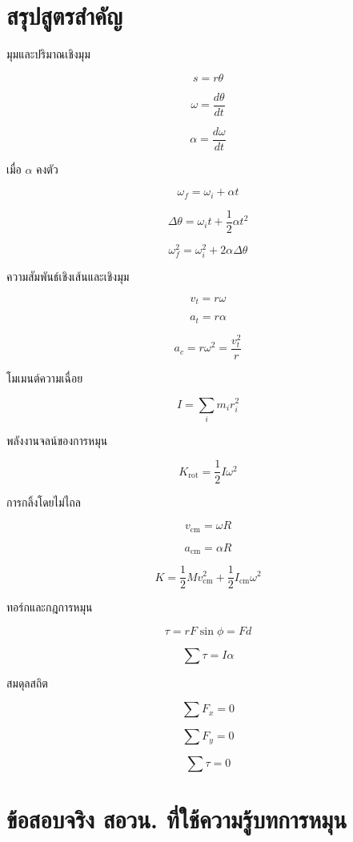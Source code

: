 \section{สรุปสูตรสำคัญ}

\begin{tcolorbox}[title=สรุปบท: การหมุนของวัตถุแข็งเกร็ง]
มุมและปริมาณเชิงมุม

\[
s=r\theta
\]

\[
\omega=\frac{d\theta}{dt}
\]

\[
\alpha=\frac{d\omega}{dt}
\]

เมื่อ $\alpha$ คงตัว

\[
\omega_f=\omega_i+\alpha t
\]

\[
\Delta\theta=\omega_i t+\frac{1}{2}\alpha t^2
\]

\[
\omega_f^2=\omega_i^2+2\alpha\Delta\theta
\]

ความสัมพันธ์เชิงเส้นและเชิงมุม

\[
v_t=r\omega
\]

\[
a_t=r\alpha
\]

\[
a_c=r\omega^2=\frac{v_t^2}{r}
\]
\end{tcolorbox}

\begin{tcolorbox}[title=สรุปบท: การหมุนของวัตถุแข็งเกร็ง ต่อ]
โมเมนต์ความเฉื่อย

\[
I=\sum_i m_i r_i^2
\]

พลังงานจลน์ของการหมุน

\[
K_{\text{rot}}=\frac{1}{2}I\omega^2
\]

การกลิ้งโดยไม่ไถล

\[
v_{\text{cm}}=\omega R
\]

\[
a_{\text{cm}}=\alpha R
\]

\[
K=\frac{1}{2}Mv_{\text{cm}}^2+\frac{1}{2}I_{\text{cm}}\omega^2
\]

ทอร์กและกฎการหมุน

\[
\tau=rF\sin\phi=Fd
\]

\[
\sum\tau=I\alpha
\]

สมดุลสถิต

\[
\sum F_x=0
\]

\[
\sum F_y=0
\]

\[
\sum\tau=0
\]
\end{tcolorbox}

\section{ข้อสอบจริง สอวน. ที่ใช้ความรู้บทการหมุน}

